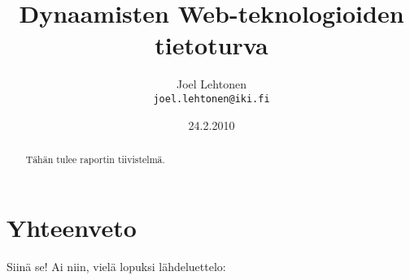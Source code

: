 \documentclass[a4paper,12pt]{article}
\title{Dynaamisten Web-teknologioiden tietoturva}
\author{Joel Lehtonen\\ \texttt{joel.lehtonen@iki.fi}}
\date{24.2.2010}
\begin{document}
\maketitle

\begin{abstract}
Tähän tulee raportin tiivistelmä.
\end{abstract}



\section{Yhteenveto}

Siinä se! Ai niin, vielä lopuksi lähdeluettelo:



\end{document}
